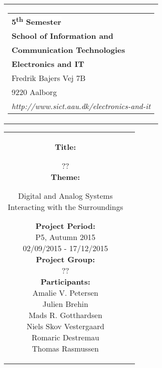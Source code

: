 % 
\thispagestyle{empty}
\begin{titlepage}
\begin{nopagebreak}
{\samepage 

\begin{tabular}{r}
\parbox{\textwidth}{  
\hfill \hspace{2cm} \parbox{8cm}{\begin{tabular}{l} %
{\small \textbf{\textcolor{aaublue}{\colorbox{white}{5\textsuperscript{th} Semester}}}}\\
{\small \textbf{\textcolor{aaublue}{School of Information and}}}\\
{\small \textbf{\textcolor{aaublue}{Communication Technologies}}}\\ 
{\small \textbf{\textcolor{aaublue}{Electronics and IT}}}\\
{\small \textcolor{aaublue}{Fredrik Bajers Vej 7B}} \\
{\small \textcolor{aaublue}{9220 Aalborg}} \\
{\small \textcolor{aaublue}{\emph{http://www.sict.aau.dk/electronics-and-it}}}
\end{tabular}}}
\end{tabular}

\begin{tabular}{cc}
\parbox{7cm}{

\textbf{Title:}

??\\ %

\textbf{Theme:} 

\small{
Digital and Analog Systems\\
Interacting with the Surroundings\\
}


\parbox{8cm}{


\textbf{Project Period:}\\
P5, Autumn 2015\\
02/09/2015 - 17/12/2015\\
   
\textbf{Project Group:}\\
??\\ %
  
\textbf{Participants:}\\
Amalie V. Petersen\\
Julien Brehin\\
Mads R. Gotthardsen\\
Niels Skov Vestergaard\\
Romaric Destremau\\
Thomas Rasmussen\\

}}
\end{tabular}}
\end{nopagebreak}
\end{titlepage}
